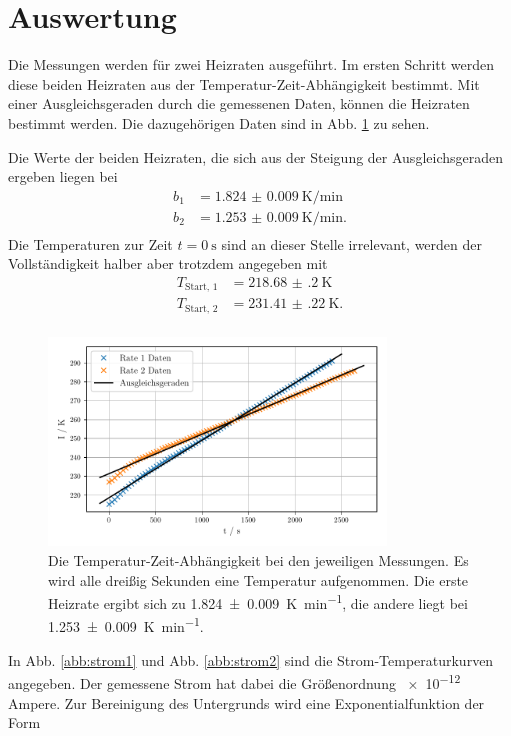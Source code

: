 \section{Auswertung}
\label{sec:Auswertung}

Die Messungen werden für zwei Heizraten ausgeführt. Im ersten Schritt werden diese beiden Heizraten aus der Temperatur-Zeit-Abhängigkeit bestimmt. Mit einer Ausgleichsgeraden durch die gemessenen Daten, können die Heizraten bestimmt werden. Die dazugehörigen Daten sind in Abb. \ref{abb:rate} zu sehen. 

Die Werte der beiden Heizraten, die sich aus der Steigung der Ausgleichsgeraden ergeben liegen bei 
\begin{align*}
    b_1 &= \SI{1.824(9)}{\kelvin\per\minute} \\
    b_2 &= \SI{1.253(9)}{\kelvin\per\minute}. \\
\end{align*}
Die Temperaturen zur Zeit $t=\SI{0}{\second}$ sind an dieser Stelle irrelevant, werden der Vollständigkeit halber aber trotzdem angegeben mit 
\begin{align*}
    T_\text{Start, 1} &= \SI{218.68(20)}{\kelvin} \\
    T_\text{Start, 2} &= \SI{231.41(22)}{\kelvin}. \\
\end{align*}
\begin{figure}
    \centering
    \includegraphics[width=0.8\textwidth]{figures/rate.pdf}
    \caption{Die Temperatur-Zeit-Abhängigkeit bei den jeweiligen Messungen. Es wird alle dreißig Sekunden eine Temperatur aufgenommen. Die erste Heizrate ergibt sich zu \SI{1.824(9)}{\kelvin\per\minute}, die andere liegt bei \SI{1.253(9)}{\kelvin\per\minute}.}
    \label{abb:rate}
\end{figure}
In Abb. \ref{abb:strom1} und Abb. \ref{abb:strom2} sind die Strom-Temperaturkurven angegeben. Der gemessene Strom hat dabei die Größenordnung \num{e-12} Ampere. Zur Bereinigung des Untergrunds wird eine Exponentialfunktion der Form 
